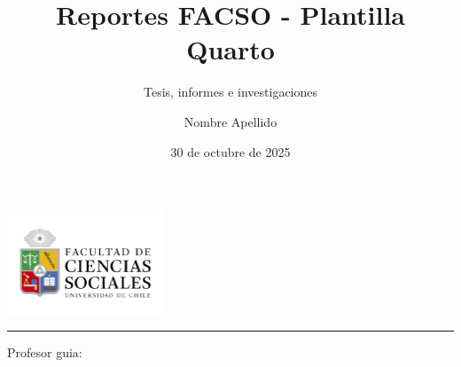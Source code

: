\documentclass[
  spanish,
  a4paper,
  oneside]{scrbook}
\title{Reportes FACSO - Plantilla Quarto}
\subtitle{Tesis, informes e investigaciones}
\author{Nombre Apellido}
\date{30 de octubre de 2025}
\makeatletter
\providecommand{\subtitle}[1]{\gdef\@subtitle{#1}}
\providecommand{\@subtitle}{}
\providecommand{\subtitle}[1]{%
  \apptocmd{\@title}{\par {\large #1 \par}}{}{}
}
\makeatother
\begin{document}
\frontmatter
\maketitle

\makeatletter
\providecommand{\subtitle}[1]{\gdef\@subtitle{#1}}
\providecommand{\@subtitle}{}
\providecommand{\frontmattercontext}{}
\providecommand{\advisorname}{}
\providecommand{\advisorlabel}{Profesor guia:}
\providecommand{\frontmatterlocation}{}

\newcommand{\PrintTitle}{%
  {\sffamily\bfseries\fontsize{24pt}{28pt}\selectfont \@title\par}%
}
\newcommand{\PrintSubtitle}{%
  \begingroup
  \edef\temp{\detokenize{\@subtitle}}%
  \ifx\temp\empty\relax
  \else
    {\sffamily\bfseries\large \@subtitle\par}%
  \fi
  \endgroup
}
\newcommand{\PrintAuthor}{%
  {\Large\bfseries \@author\par}%
}
\newcommand{\PrintDate}{%
  {\small \@date\par}%
}
\makeatother

\begin{titlepage}
\thispagestyle{empty}
\begin{center}
\vspace*{10mm}

\includegraphics[width=0.35\textwidth]{assets/cover.png}\par
\vspace{12mm}

\PrintTitle
\vspace{6mm}
\PrintSubtitle

\vspace{22mm}
\begingroup
\edef\temp{\detokenize{\frontmattercontext}}%
\ifx\temp\empty\relax
\else
  {\normalsize \frontmattercontext\par}
\fi
\endgroup

\vspace{18mm}
\PrintAuthor

\vspace{16mm}
\begingroup
\edef\temp{\detokenize{\advisorname}}%
\ifx\temp\empty\relax
\else
  \rule{0.45\textwidth}{0.4pt}\par
  {\small \advisorlabel\ \advisorname\par}
\fi
\endgroup

\vfill
\begingroup
\edef\temp{\detokenize{\frontmatterlocation}}%
\ifx\temp\empty\relax
\else
  {\small \frontmatterlocation\par}
\fi
\endgroup
\PrintDate

\end{center}
\end{titlepage}
\end{document}
